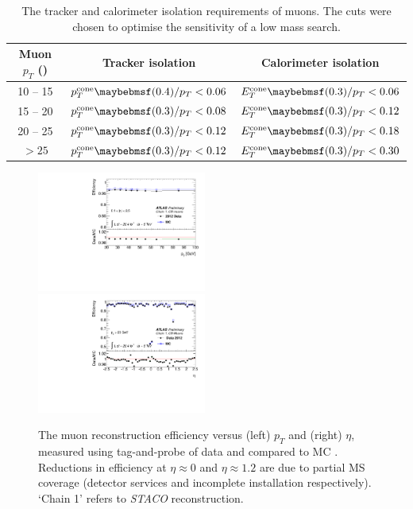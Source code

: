 \begin{table}[h]
	\begin{tabular}{c@{\hskip 0.3in}c@{\hskip 0.3in}c}
		Muon $p_T$ (\GeV) & Tracker isolation & Calorimeter isolation \\
		\hline
		10 -- 15 & $p_T^{\text{cone}}\parenths{0.4}/p_T < 0.06$ & $E_T^{\text{cone}}\parenths{0.3}/p_T < 0.06$ \\
		15 -- 20 & $p_T^{\text{cone}}\parenths{0.3}/p_T < 0.08$ & $E_T^{\text{cone}}\parenths{0.3}/p_T < 0.12$ \\
		20 -- 25 & $p_T^{\text{cone}}\parenths{0.3}/p_T < 0.12$ & $E_T^{\text{cone}}\parenths{0.3}/p_T < 0.18$ \\
		$> 25$   & $p_T^{\text{cone}}\parenths{0.3}/p_T < 0.12$ & $E_T^{\text{cone}}\parenths{0.3}/p_T < 0.30$ \\
	\end{tabular}
	\caption{The tracker and calorimeter isolation requirements of muons. The cuts were 
	chosen to optimise the sensitivity of a low mass \HWWlvlv search.}
	\label{tab:objects:mu_iso}
\end{table}

\begin{figure}
	\includegraphics[width=0.495\textwidth]{tex/selection/mu_recoeff_pt}
	\hfill
	\includegraphics[width=0.495\textwidth]{tex/selection/mu_recoeff_eta}
	\caption{The muon reconstruction efficiency versus (left) $p_T$ and (right) 
	$\eta$, measured using tag-and-probe of \HepProcess{\PZ \HepTo \Pmu\Pmu} data 
	and compared to MC \cite{Muons:2012}. Reductions in efficiency at $\eta \approx 0$ 
	and $\eta \approx 1.2$ are due to partial \ac{MS} coverage (detector services and 
	incomplete installation respectively). `Chain 1' refers to \textit{STACO} 
	reconstruction.}
	\label{fig:objects:mu_recoeff}
\end{figure}



